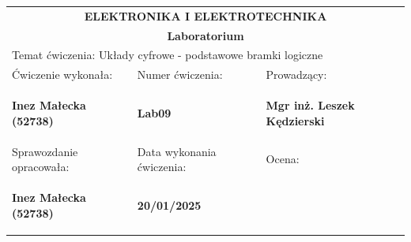\documentclass[,a4paper,12pt]{article}
\begin{document}
\begin{center}
    \begin{tabular}{|p{6cm}|p{4.5cm}|p{4.5cm}|}
        \hline
        \multicolumn{3}{|c|}{\textbf{\large ELEKTRONIKA I ELEKTROTECHNIKA}} \\ 

        \multicolumn{3}{|c|}{\textbf{ Laboratorium}} \\
        \hline
        \multicolumn{3}{|l|}{Temat ćwiczenia: Układy cyfrowe - podstawowe bramki logiczne} \\
        \hline
        {\small Ćwiczenie wykonała:} &
        {\small Numer ćwiczenia:} &
        {\small Prowadzący:} \\
        \begin{center}
            \textbf{Inez Małecka (52738) }
        \end{center} &
        \begin{center}
            \textbf{Lab09}
        \end{center} &
        \begin{center}
            \textbf{Mgr inż. Leszek Kędzierski}
        \end{center}
        \\
        \hline
        {\small Sprawozdanie opracowała:} &
        {\small Data wykonania ćwiczenia:} &
        {\small Ocena:} \\
        \begin{center}
            \textbf{
        Inez Małecka (52738)}
        \end{center}
         &
         \begin{center}
             \textbf{20/01/2025}
         \end{center}
        &
        \\
        \hline
    \end{tabular}
\end{center}
\end{document}
